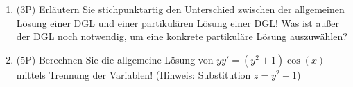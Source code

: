 \begin{enumerate}[label=(\alph*)]
	
	\item (3P) Erläutern Sie stichpunktartig den Unterschied zwischen der allgemeinen Lösung einer DGL und einer partikulären Lösung einer DGL! 
	Was ist außer der DGL noch notwendig, um eine konkrete partikuläre Lösung auszuwählen?
	
	\bigskip
	\bigskip
	\bigskip
	\bigskip
	\bigskip
	\bigskip
	\bigskip
	\bigskip
	\bigskip
	\bigskip
	\bigskip
	\bigskip
	\bigskip
	\bigskip
	\bigskip
	\bigskip
	
	\item (5P) Berechnen Sie die allgemeine Lösung von $yy'=(y^2+1)\cos(x)$ mittels Trennung der Variablen! (Hinweis: Substitution $z=y^2+1$)	
\end{enumerate}

